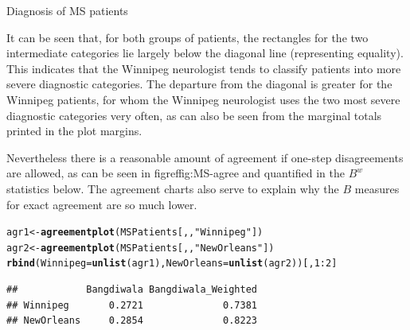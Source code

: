 \documentclass[11pt]{book}\usepackage[]{graphicx}\usepackage[]{color}
\makeatletter
\newcommand{\hlnum}[1]{\textcolor[rgb]{0.686,0.059,0.569}{#1}}%
\newcommand{\hlstr}[1]{\textcolor[rgb]{0.192,0.494,0.8}{#1}}%
\newcommand{\hlopt}[1]{\textcolor[rgb]{0,0,0}{#1}}%
\newcommand{\hlstd}[1]{\textcolor[rgb]{0.345,0.345,0.345}{#1}}%
\newcommand{\hlkwb}[1]{\textcolor[rgb]{0.69,0.353,0.396}{#1}}%
\newcommand{\hlkwc}[1]{\textcolor[rgb]{0.333,0.667,0.333}{#1}}%
\newcommand{\hlkwd}[1]{\textcolor[rgb]{0.737,0.353,0.396}{\textbf{#1}}}%
\newenvironment{kframe}{%
 \def\at@end@of@kframe{}%
 \ifinner\ifhmode%
  \def\at@end@of@kframe{\end{minipage}}%
  \begin{minipage}{\columnwidth}%
 \fi\fi%
 \def\FrameCommand##1{\hskip\@totalleftmargin \hskip-\fboxsep
 \colorbox{shadecolor}{##1}\hskip-\fboxsep
     \hskip-\linewidth \hskip-\@totalleftmargin \hskip\columnwidth}%
 \MakeFramed {\advance\hsize-\width
   \@totalleftmargin\z@ \linewidth\hsize
   \@setminipage}}%
 {\par\unskip\endMakeFramed%
 \at@end@of@kframe}
\newenvironment{knitrout}{}{} %
\renewenvironment{knitrout}{\small\renewcommand{\baselinestretch}{.85}}{} %
\makeatother
\begin{document}
\begin{Example}[MS2]{Diagnosis of MS patients}
\begin{knitrout}
\end{knitrout}


It can be seen that, for
both groups of patients, the rectangles for the 
two intermediate categories lie largely below the diagonal line
(representing equality).  This 
indicates that the Winnipeg neurologist tends to classify patients
into more severe diagnostic categories.
The departure from the diagonal is greater for the Winnipeg patients,
for whom the Winnipeg neurologist uses the two most severe diagnostic
categories very often, as can also be seen from the marginal totals
printed in the plot margins.

Nevertheless there is a reasonable amount of agreement if one-step
disagreements are allowed, as can be seen in figref{fig:MS-agree}
and quantified in the $B^w$ statistics below.
The agreement charts also serve to explain why the $B$ measures for
exact agreement are so much lower.
\begin{knitrout}
\color{fgcolor}\begin{kframe}
\begin{alltt}
\hlstd{agr1} \hlkwb{<-} \hlkwd{agreementplot}\hlstd{(MSPatients[,,}\hlstr{"Winnipeg"}\hlstd{])}
\hlstd{agr2} \hlkwb{<-} \hlkwd{agreementplot}\hlstd{(MSPatients[,,}\hlstr{"New Orleans"}\hlstd{])}
\hlkwd{rbind}\hlstd{(}\hlkwc{Winnipeg}\hlstd{=}\hlkwd{unlist}\hlstd{(agr1),} \hlkwc{NewOrleans}\hlstd{=}\hlkwd{unlist}\hlstd{(agr2))[,}\hlnum{1}\hlopt{:}\hlnum{2}\hlstd{]}
\end{alltt}
\begin{verbatim}
##            Bangdiwala Bangdiwala_Weighted
## Winnipeg       0.2721              0.7381
## NewOrleans     0.2854              0.8223
\end{verbatim}
\end{kframe}
\end{knitrout}





\end{Example}
\end{document}
